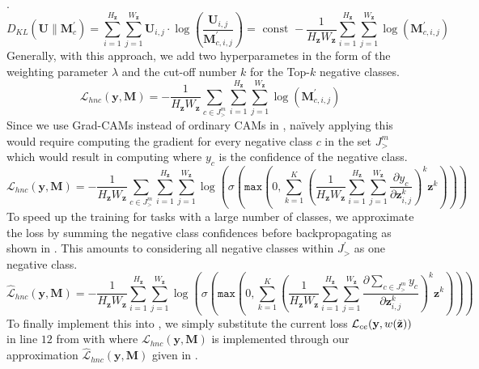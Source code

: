 .
\begin{equation}
\label{eq:kl-simplification}
D_{K L}\left(\boldsymbol{U} \| \boldsymbol{M}_{c}^{\prime}\right)=\sum_{i=1}^{H_\mathbf{z}} \sum_{j=1}^{W_\mathbf{z}} \boldsymbol{U}_{i,j} \cdot \log \left( \frac{\boldsymbol{U}_{i,j}}{\boldsymbol{M}_{c, i, j}^{\prime}} \right) =\text { const }-\frac{1}{H_\mathbf{z} W_\mathbf{z}} \sum_{i=1}^{H_\mathbf{z}} \sum_{j=1}^{W_\mathbf{z}} \log \left(\boldsymbol{M}_{c, i, j}^{\prime}\right)
\end{equation}
Generally, with this approach, we add two hyperparametes in the form of the weighting parameter $\lambda$ and the cut-off number $k$ for the Top-$k$ negative classes.
\begin{equation}
\label{eq:hnc-kl-simple}
    \mathcal{L}_{hnc}(\mathbf{y}, \boldsymbol{M})= -\frac{1}{H_\mathbf{z} W_\mathbf{z}} \sum_{c \in J^{m}_>} \sum_{i=1}^{H_\mathbf{z}} \sum_{j=1}^{W_\mathbf{z}} \log \left(\boldsymbol{M}_{c, i, j}^{\prime}\right)
\end{equation}
Since we use Grad-CAMs instead of ordinary CAMs in \divcam, na\"{i}vely applying this would require computing the gradient for every negative class $c$ in the set $J^m_>$ which would result in computing  where $y_c$ is the confidence of the negative class. 
\begin{equation}
\label{eq:hnc-kl-grad-cam}
    \mathcal{L}_{hnc}(\mathbf{y}, \boldsymbol{M})= -\frac{1}{H_\mathbf{z} W_\mathbf{z}} \sum_{c \in J^{m}_>} \sum_{i=1}^{H_\mathbf{z}} \sum_{j=1}^{W_\mathbf{z}} \log \left( \sigma \left(\mathtt{max}\left(0,\sum_{k=1}^K\left(\frac{1}{H_\mathbf{z}W_\mathbf{z}} \sum_{i=1}^{H_\mathbf{z}} \sum_{j=1}^{W_\mathbf{z}} \frac{\partial y_c}{\partial \mathbf{z}_{i,j}^k}\right)^k \mathbf{z}^k\right)\right)\right)
\end{equation}
To speed up the training for tasks with a large number of classes, we approximate the loss by summing the negative class confidences before backpropagating as shown in . This amounts to considering all negative classes within $J^\prime_>$ as one negative class. 
\begin{equation}
\label{eq:hnc-kl-grad-cam-approx}
    \widehat{\mathcal{L}}_{hnc}(\mathbf{y}, \boldsymbol{M})= -\frac{1}{H_\mathbf{z} W_\mathbf{z}} \sum_{i=1}^{H_\mathbf{z}} \sum_{j=1}^{W_\mathbf{z}} \log \left( \sigma \left(\mathtt{max}\left(0,\sum_{k=1}^K\left(\frac{1}{H_\mathbf{z}W_\mathbf{z}} \sum_{i=1}^{H_\mathbf{z}} \sum_{j=1}^{W_\mathbf{z}} \frac{\partial \sum_{c \in J^{m}_>} y_c}{\partial \mathbf{z}_{i,j}^k}\right)^k \mathbf{z}^k\right)\right)\right)
\end{equation}
To finally implement this into \divcam, we simply substitute the current loss $\mathcal{L}_{ce}(\mathbf{y}, w(\Tilde{\mathbf{z}}))$ in line $12$ from  with  where $\mathcal{L}_{hnc}(\mathbf{y}, \boldsymbol{M})$ is implemented through our approximation $\widehat{\mathcal{L}}_{hnc}(\mathbf{y}, \boldsymbol{M})$ given in . 


